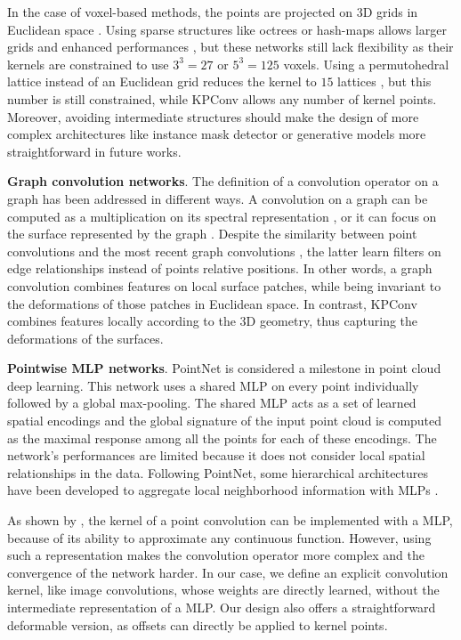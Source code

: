 \documentclass[10pt,twocolumn,letterpaper]{article}
\begin{document}
In the case of voxel-based methods, the points are projected on 3D grids in Euclidean space \cite{maturana2015voxnet, roynard2018classification, ben20183dmfv}. Using sparse structures like octrees or hash-maps allows larger grids and enhanced performances \cite{riegler2017octnet, graham20183d}, but these networks still lack flexibility as their kernels are constrained to use $3^3 = 27$ or $5^3 = 125$ voxels. Using a permutohedral lattice instead of an Euclidean grid reduces the kernel to $15$ lattices \cite{su2018splatnet}, but this number is still constrained, while KPConv allows any number of kernel points. Moreover, avoiding intermediate structures should make the design of more complex architectures like instance mask detector or generative models more straightforward in future works.

\noindent
\textbf{Graph convolution networks}. The definition of a convolution operator on a graph has been addressed in different ways. A convolution on a graph can be computed as a multiplication on its spectral representation \cite{defferrard2016convolutional, yi2017syncspeccnn}, or it can focus on the surface represented by the graph \cite{masci2015geodesic, bronstein2017geometric, simonovsky2017dynamic, monti2017geometric}. Despite the similarity between point convolutions and the most recent graph convolutions \cite{verma2018feastnet, wang2018dynamic}, the latter learn filters on edge relationships instead of points relative positions. In other words, a graph convolution combines features on local surface patches, while being invariant to the deformations of those patches in Euclidean space. In contrast, KPConv combines features locally according to the 3D geometry, thus capturing the deformations of the surfaces.

\noindent
\textbf{Pointwise MLP networks}. PointNet \cite{qi2017pointnet} is considered a milestone in point cloud deep learning. This network uses a shared MLP on every point individually followed by a global max-pooling. The shared MLP acts as a set of learned spatial encodings and the global signature of the input point cloud is computed as the maximal response among all the points for each of these encodings. The network's performances are limited because it does not consider local spatial relationships in the data. Following PointNet, some hierarchical architectures have been developed to aggregate local neighborhood information with MLPs \cite{qi2017pointnet++, li2018so, liu2018point2sequence}.

As shown by \cite{wang2018deep, li2018pointcnn, hermosilla2018monte}, the kernel of a point convolution can be implemented with a MLP, because of its ability to approximate any continuous function. However, using such a representation makes the convolution operator more complex and the convergence of the network harder. In our case, we define an explicit convolution kernel, like image convolutions, whose weights are directly learned, without the intermediate representation of a MLP. Our design also offers a straightforward deformable version, as offsets can directly be applied to kernel points.
\end{document}
